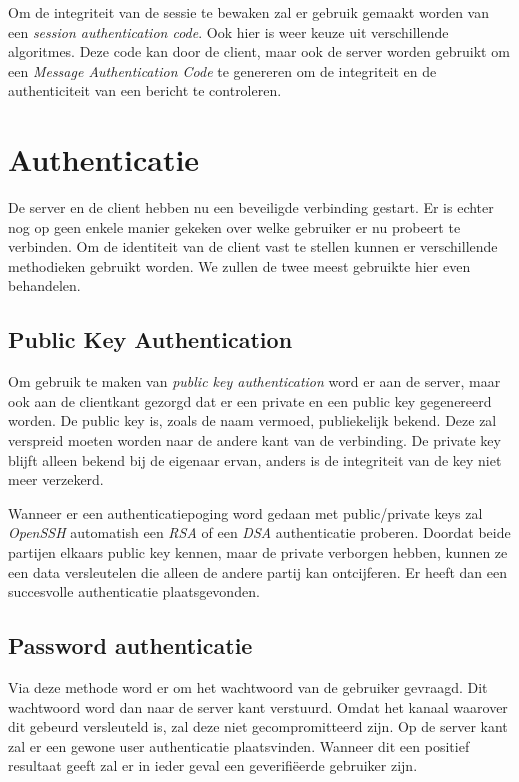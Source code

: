 Om de integriteit van de sessie te bewaken zal er gebruik gemaakt worden van een \emph{session authentication code}. Ook hier is weer keuze uit verschillende algoritmes. Deze code kan door de client, maar ook de server worden gebruikt om een \emph{Message Authentication Code} te genereren om de integriteit en de authenticiteit van een bericht te controleren. 

\section{Authenticatie}
De server en de client hebben nu een beveiligde verbinding gestart. Er is echter nog op geen enkele manier gekeken over welke gebruiker er nu probeert te verbinden. Om de identiteit van de client vast te stellen kunnen er verschillende methodieken gebruikt worden. We zullen de twee meest gebruikte hier even behandelen. 

\subsection{Public Key Authentication}
Om gebruik te maken van \emph{public key authentication} word er aan de server, maar ook aan de clientkant gezorgd dat er een private en een public key gegenereerd worden. De public key is, zoals de naam vermoed, publiekelijk bekend. Deze zal verspreid moeten worden naar de andere kant van de verbinding. De private key blijft alleen bekend bij de eigenaar ervan, anders is de integriteit van de key niet meer verzekerd. 

Wanneer er een authenticatiepoging word gedaan met public/private keys zal \emph{OpenSSH} automatish een \emph{RSA}\cite{bib.rsa}\cite{bib.rsa.pres} of een \emph{DSA}\cite{bib.dsa} authenticatie proberen. Doordat beide partijen elkaars public key kennen, maar de private verborgen hebben, kunnen ze een data versleutelen die alleen de andere partij kan ontcijferen. Er heeft dan een succesvolle authenticatie plaatsgevonden. 

\subsection{Password authenticatie}
Via deze methode word er om het wachtwoord van de gebruiker gevraagd. Dit wachtwoord word dan naar de server kant verstuurd. Omdat het kanaal waarover dit gebeurd versleuteld is, zal deze niet gecompromitteerd zijn. Op de server kant zal er een gewone user authenticatie plaatsvinden. Wanneer dit een positief resultaat geeft zal er in ieder geval een geverifi\"{e}erde gebruiker zijn.

